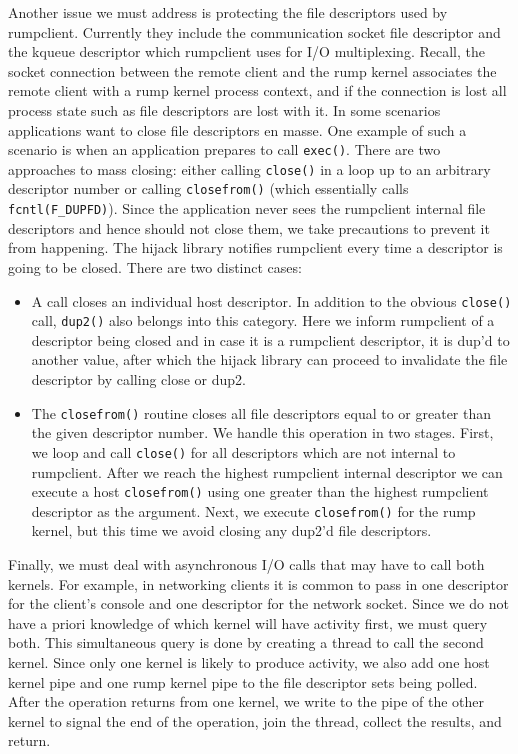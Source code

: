 Another issue we must address is protecting the file descriptors
used by rumpclient.  Currently they include the communication socket
file descriptor and the kqueue descriptor which rumpclient uses
for I/O multiplexing.  Recall, the socket connection between the
remote client and the rump kernel associates the remote client with a rump kernel
process context, and if the connection is lost all process state
such as file descriptors are lost with it.  In some scenarios
applications want to close file descriptors en masse.
One example of such a scenario is when an application prepares to
call \verb+exec()+.  There are two approaches to mass closing:
either calling \verb+close()+ in a loop up to an arbitrary descriptor
number or calling \verb+closefrom()+ (which essentially calls
\verb+fcntl(F_DUPFD)+).  Since the application never sees the
rumpclient internal file descriptors and hence should not close
them, we take precautions to prevent it from happening.
The hijack library notifies rumpclient every time a descriptor is
going to be closed.  There are two distinct cases:

\begin{itemize}
\item   A call closes an individual host descriptor.  In addition
	to the obvious \verb+close()+ call, \verb+dup2()+ also
	belongs into this category.  Here we inform rumpclient of
	a descriptor being closed and in case it is a rumpclient
	descriptor, it is dup'd to another value, after which the
	hijack library can proceed to invalidate the file descriptor
	by calling close or dup2.

\item   The \verb+closefrom()+ routine closes all file descriptors
	equal to or greater than the given descriptor number.  We
	handle this operation in two stages.  First, we loop and call
	\verb+close()+ for all descriptors which are not internal to
	rumpclient.
	After we reach the highest rumpclient internal descriptor we can
	execute a host \verb+closefrom()+ using one greater than
	the highest rumpclient descriptor as the argument.  Next,
	we execute \texttt{closefrom()} for the rump kernel, but this time
	we avoid closing any dup2'd file descriptors.
\end{itemize}

Finally, we must deal with asynchronous I/O calls that may have to
call both kernels.  For example, in networking clients it is common
to pass in one descriptor for the client's console and one descriptor for the
network socket.  Since we do not have a priori knowledge of which
kernel will have activity first, we must query both.  This simultaneous
query is done by creating a thread to call the second kernel.  Since only
one kernel is likely to produce activity, we also add one host kernel
pipe and one rump kernel pipe to the file descriptor sets being polled.
After the operation returns from one kernel, we write to the pipe of
the other kernel to signal the end of the operation, join the thread,
collect the results, and return.


